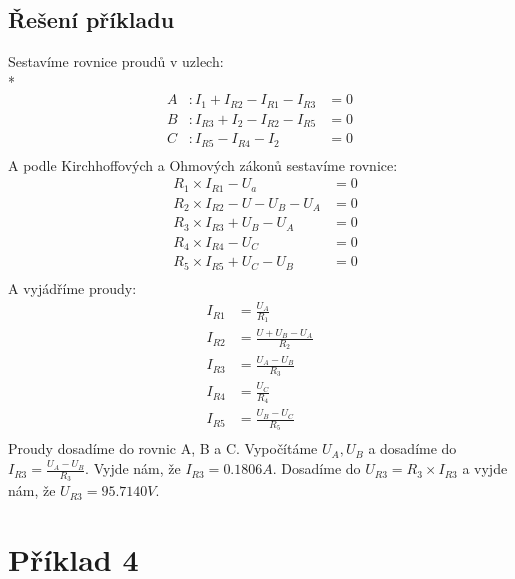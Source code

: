 \documentclass[a4paper, 10pt, fleqn]{article}
\begin{document}
\subsection*{Řešení příkladu}
Sestavíme rovnice proudů v uzlech:\\*
\begin{align*}
A&: I_{1} + I_{R2} - I_{R1} - I_{R3} &= 0 \\
B&: I_{R3} + I_{2} - I_{R2} - I_{R5} &= 0 \\
C&: I_{R5} - I_{R4} - I_{2} &=0 \\
\end{align*}
A podle Kirchhoffových a Ohmových zákonů sestavíme rovnice:\\
\begin{align*}
&R_{1} \times I_{R1} - U_{a} &= 0\\
&R_{2} \times I_{R2} - U - U_{B} - U_{A} &= 0 \\
&R_{3} \times I_{R3} + U_{B} - U_{A} &= 0 \\
&R_{4} \times I_{R4} - U_{C} &= 0 \\
&R_{5} \times I_{R5} + U_{C} - U_{B} &= 0 \\
\end{align*}
A vyjádříme proudy:
\begin{align*}
I_{R1} &= \frac{U_{A}}{R_{1}}\\
I_{R2} &= \frac{U + U_{B} - U_{A}}{R_{2}} \\
I_{R3} &= \frac{U_{A} - U_{B}}{R_{3}}\\
I_{R4} &= \frac{U_{C}}{R_{4}}\\
I_{R5} &= \frac{U_{B} - U_{C}}{R_{5}}\\
\end{align*}
Proudy dosadíme do rovnic A, B a C. Vypočítáme $U_{A}, U_{B}$ a dosadíme do
$I_{R3} = \frac{U_{A} - U_{B}}{R_{3}}$. Vyjde nám, že $I_{R3} = 0.1806 A$.
Dosadíme do $U_{R3} = R_{3} \times I_{R3}$ a vyjde nám, že $U_{R3} = 95.7140 V$.
\newpage
\section*{Příklad 4}
\end{document}
